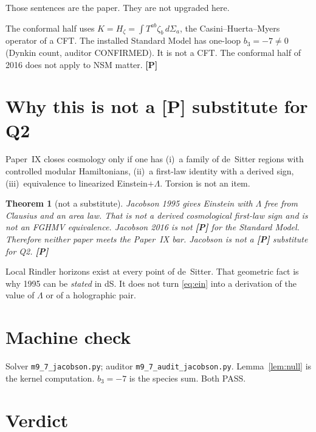 \documentclass[11pt]{article}
\newtheorem{theorem}{Theorem}[section]
\theoremstyle{definition}
\newcommand{\pP}{\textbf{[P]}}
\begin{document}
Those sentences are the paper. They are not upgraded here.

The conformal half uses $K=H_\zeta=\int T^{ab}\zeta_b\,d\Sigma_a$,
the Casini--Huerta--Myers operator of a CFT. The installed
Standard Model has one-loop $b_3=-7\neq 0$ (Dynkin count,
auditor CONFIRMED). It is not a CFT. The conformal half of 2016
does not apply to NSM matter. \pP{}

\section{Why this is not a \pP{} substitute for Q2}

Paper~IX closes cosmology only if one has (i)~a family of de~Sitter
regions with controlled modular Hamiltonians, (ii)~a first-law
identity with a derived sign, (iii)~equivalence to linearized
Einstein$+\Lambda$. Torsion is not an item.

\begin{theorem}[not a substitute]
\label{thm:nosub}
Jacobson 1995 gives Einstein with $\Lambda$ free from Clausius and
an area law. That is not a derived cosmological first-law sign and
is not an FGHMV equivalence. Jacobson 2016 is not \pP{} for the
Standard Model. Therefore neither paper meets the Paper~IX bar.
Jacobson is not a \pP{} substitute for Q2. \pP{}
\end{theorem}

Local Rindler horizons exist at every point of de~Sitter. That
geometric fact is why 1995 can be \emph{stated} in dS. It does
not turn \eqref{eq:ein} into a derivation of the value of $\Lambda$
or of a holographic pair.

\section{Machine check}

Solver \texttt{m9\_7\_jacobson.py}; auditor
\texttt{m9\_7\_audit\_jacobson.py}. Lemma~\ref{lem:null} is the
kernel computation. $b_3=-7$ is the species sum. Both PASS.

\section{Verdict}
\end{document}
